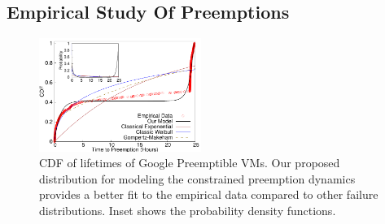 






\subsection{Empirical Study Of Preemptions}


\begin{figure}
  \includegraphics[width=0.47\textwidth]{../data/gnuplot-figures/sigmetrics-fig-cdf-prob-inset-time.pdf} 
  \caption{CDF of lifetimes of Google Preemptible VMs. Our proposed distribution for modeling the constrained preemption dynamics provides a better fit to the empirical data compared to other failure distributions. Inset shows the probability density functions.}
  \label{fig:gcp1}
\end{figure}

